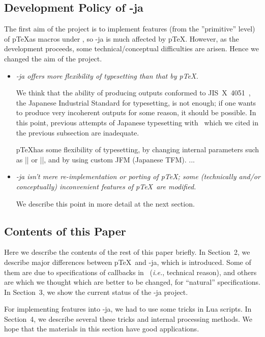 \documentclass{ajt}
\begin{document}
\subsection{Development Policy of \LuaTeX-ja}
\label{ssec-pol} 
The first aim of the project is to implement features (from the
''primitive'' level) of p\TeX as macros under \LuaTeX, so \LuaTeX-ja is
much affected by p\TeX.  However, as the development proceeds, some
technical/conceptual difficulties are arisen. Hence we changed the aim
of the project.
\begin{itemize}
\item\emph{\LuaTeX-ja offers more flexibility of typesetting than that by
     p\TeX.}

     We think that the ability of producing outputs conformed to
     JIS~X~4051~\cite{jisx4051}, the Japanese Industrial Standard for
     typesetting, is not enough; if one wants to produce very
     incoherent outputs for some reason, it should be possible. 
In this point, previous attempts of Japanese typesetting with \LuaTeX\
     which we cited in the previous subsection are inadequate.

p\TeX has some flexibility of typesetting, by changing internal
     parameters such as |\kanjiskip| or |\prebreakpenalty|, and by using
     custom JFM (Japanese TFM). ...

\item\emph{\LuaTeX-ja isn't mere re-implementation or porting of p\TeX;
     some (technically and/or conceptually) inconvenient features of
     p\TeX\ are modified.} 

     We describe this point in more detail at the next section.
\end{itemize}


\subsection{Contents of this Paper}
Here we describe the contents of the rest of this paper briefly.  In
Section~2, we describe major differences between p\TeX\ and \LuaTeX-ja,
which is introduced. Some of them are due to specifications of callbacks
in \LuaTeX\ (\emph{i.e.}, technical reason), and others are which we
thought which are better to be changed, for ``natural''
specifications. In Section~3, we show the current status of the
\LuaTeX-ja project.

For implementing features into \LuaTeX-ja, we had to use some tricks in
Lua scripts.  In Section~4, we describe several these tricks and
internal processing methods.  We hope that the materials in this section
have good applications.
\end{document}
